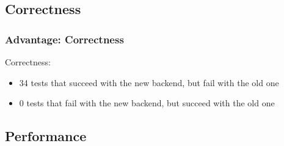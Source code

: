 \documentclass[compress,t]{beamer}
\begin{document}
\subsection[Fixes]{Correctness}

\begin{frame}
  \frametitle{Advantage: Correctness}

  Correctness:
  \begin{itemize}
    \item 34 tests that succeed with the new backend, but fail with the old one
    \item \hspace*{0.5em}0 tests that fail with the new backend, but succeed with the old one
  \end{itemize}

\end{frame}

\subsection[Perf]{Performance}
\end{document}
